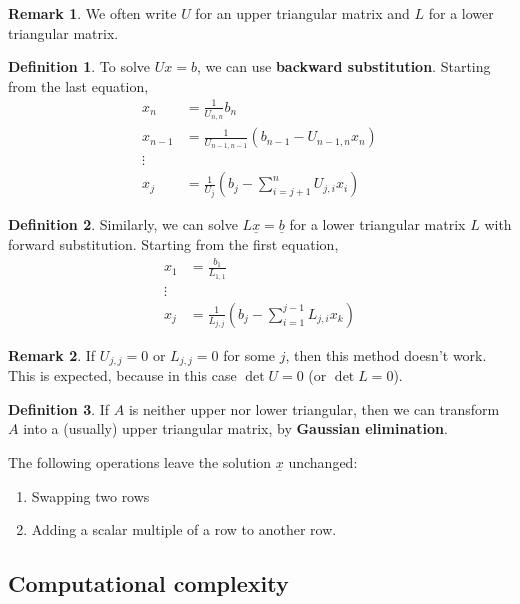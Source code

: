\documentclass[12pt,a4paper]{article}
\theoremstyle{definition}
\newtheorem{definition}{Definition}[subsection]
\newtheorem*{remark}{Remark}
\begin{document}
\begin{remark}
	We often write $U$ for an upper triangular matrix and $L$ for a lower triangular matrix.
\end{remark}

\begin{definition}
	To solve $Ux = b$, we can use \textbf{backward substitution}. Starting from the last equation,
	\[
		\begin{aligned}
			x_n & = \frac{1}{U_{n, n}} b_n \\
			x_{n - 1} & = \frac{1}{U_{n - 1, n - 1}} (b_{n - 1} - U_{n - 1, n} x_n) \\
			\vdots & \\
			x_j & = \frac{1}{U_j} \left( b_j - \sum_{i = j + 1}^{n} U_{j, i} x_i \right)
		\end{aligned}
	\]
\end{definition}

\begin{definition}
	Similarly, we can solve $L \underline{x} = \underline{b}$ for a lower triangular matrix $L$ with forward substitution. Starting from the first equation,
	\[
		\begin{aligned}
			x_1 & = \frac{b_1}{L_{1, 1}} \\
			\vdots & \\
			x_j & = \frac{1}{L_{j, j}} \left( b_j - \sum_{i = 1}^{j - 1} L_{j, i} x_k \right)
		\end{aligned}
	\]
\end{definition}

\begin{remark}
	If $U_{j, j} = 0$ or $L_{j, j} = 0$ for some $j$, then this method doesn't work. This is expected, because in this case $\det U = 0$ (or $\det L = 0$).
\end{remark}

\begin{definition}
	If $A$ is neither upper nor lower triangular, then we can transform $A$ into a (usually) upper triangular matrix, by \textbf{Gaussian elimination}.

	The following operations leave the solution $\underline{x}$ unchanged:
	\begin{enumerate}
		\item Swapping two rows
		\item Adding a scalar multiple of a row to another row.
	\end{enumerate}
\end{definition}

\subsection{Computational complexity}
\end{document}
